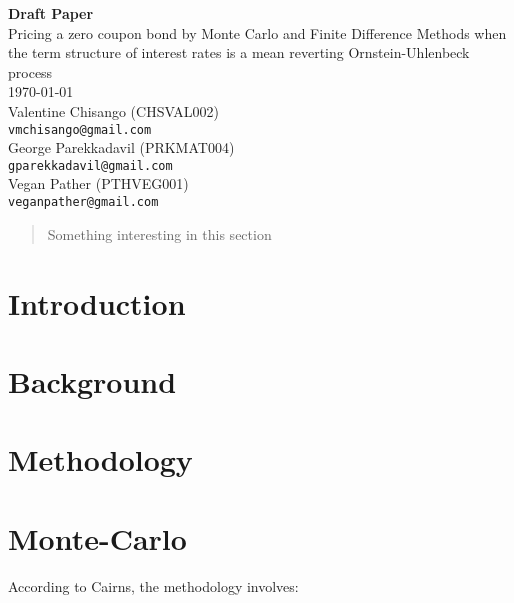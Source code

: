 \documentclass[12pt,a4paper]{article}
\begin{document}
	
	\begin{titlepage}
		
		\begin{center}
			\textbf{{\Large Draft Paper}}\\
			\vspace{1cm}
			{\Large Pricing a zero coupon bond by Monte Carlo and Finite Difference Methods when the term structure of interest rates is a mean reverting Ornstein-Uhlenbeck process}\\
			\vspace{1cm}
			\today\\
			Valentine Chisango (CHSVAL002)\\
			{\tt vmchisango@gmail.com}\\ 
			
			George Parekkadavil (PRKMAT004)\\
			{\tt gparekkadavil@gmail.com}\\
			
			Vegan Pather (PTHVEG001)\\
			\tt {veganpather@gmail.com}
			
		\end{center}
	
	\begin{abstract}
		Something interesting in this section
	\end{abstract}	

	\end{titlepage}
	\newpage
	
	\section{Introduction}
	\label{sec: Intro}
	
	\newpage
	\section{Background}
	\label{sec: Backgrd}
	
	\newpage
	\section{Methodology}
	\label{sec: Method}
	
	\section{Monte-Carlo}

According to Cairns, the methodology involves:
\end{document}
